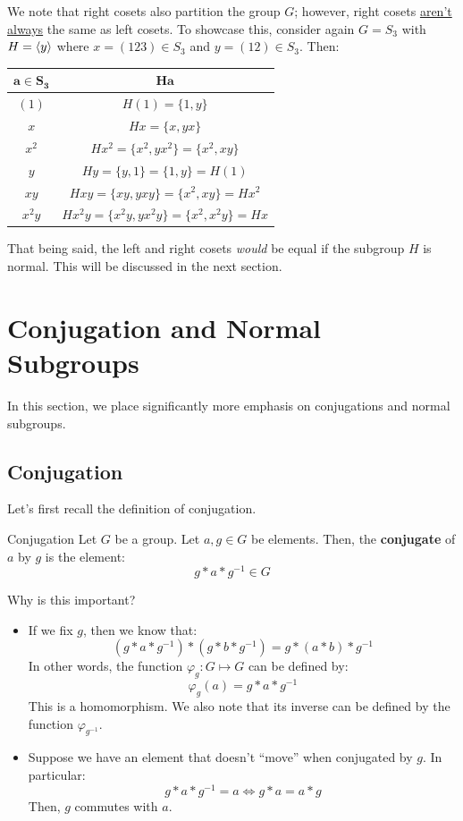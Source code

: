 \documentclass[letterpaper]{article}
\begin{document}
We note that right cosets also partition the group $G$; however, right cosets \underline{aren't always} the same as left cosets. To showcase this, consider again $G = S_3$ with $H = \langle y \rangle$ where $x = (123) \in S_3$ and $y = (12) \in S_3$. Then:
\begin{center}
    \begin{tabular}{c|c}
        $\mathbf{a \in S_3}$ & $\mathbf{Ha}$ \\ 
        \hline 
        $(1)$       & $H(1) = \{1, y\}$ \\ 
        $x$         & $Hx = \{x, yx\}$ \\ 
        $x^2$       & $Hx^2 = \{x^2, yx^2\} = \{x^2, xy\}$ \\ 
        $y$         & $Hy = \{y, 1\} = \{1, y\} = H(1)$ \\ 
        $xy$        & $Hxy = \{xy, yxy\} = \{x^2, xy\} = Hx^2$ \\ 
        $x^2 y$     & $Hx^2 y = \{x^2 y, yx^2 y\} = \{x^2, x^2 y\} = Hx$
    \end{tabular}
\end{center}
That being said, the left and right cosets \emph{would} be equal if the subgroup $H$ is normal. This will be discussed in the next section.












\newpage 
\section{Conjugation and Normal Subgroups}
In this section, we place significantly more emphasis on conjugations and normal subgroups. 

\subsection{Conjugation}
Let's first recall the definition of conjugation.
\begin{definition}{Conjugation}{}
    Let $G$ be a group. Let $a, g \in G$ be elements. Then, the \textbf{conjugate} of $a$ by $g$ is the element: 
    \[g * a * g^{-1} \in G\]
\end{definition}
Why is this important? 
\begin{itemize}
    \item If we fix $g$, then we know that: 
    \[(g * a * g^{-1}) * (g * b * g^{-1}) = g * (a * b) * g^{-1}\]
    In other words, the function $\varphi_g: G \mapsto G$ can be defined by: 
    \[\varphi_{g}(a) = g * a * g^{-1}\]
    This is a homomorphism. We also note that its inverse can be defined by the function $\varphi_{g^{-1}}$.
    
    \item Suppose we have an element that doesn't ``move'' when conjugated by $g$. In particular: 
    \[g * a * g^{-1} = a \iff g * a = a * g\]
    Then, $g$ commutes with $a$. 
\end{itemize}
\end{document}
